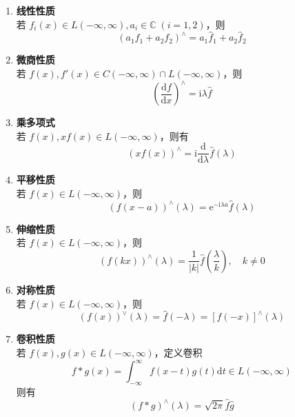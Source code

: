 \documentclass[12pt,a4paper]{ctexart}
\begin{document}
	\begin{enumerate}
		\item \textbf{线性性质} \\
		若 $f_i(x) \in L(-\infty, \infty), a_i \in \mathbb{C} \; (i=1,2)$，则
		\begin{equation}
			(a_1 f_1 + a_2 f_2)^{\wedge} = a_1 \hat{f}_1 + a_2 \hat{f}_2
		\end{equation}
		
		\item \textbf{微商性质} \\
		若 $f(x), f'(x) \in C(-\infty, \infty) \cap L(-\infty, \infty)$，则
		\begin{equation}
			\left( \frac{\mathrm{d}f}{\mathrm{d}x} \right)^{\wedge} = \mathrm{i}\lambda \hat{f}
		\end{equation}
		
		\item \textbf{乘多项式} \\
		若 $f(x), xf(x) \in L(-\infty, \infty)$，则有
		\begin{equation}
			(xf(x))^{\wedge} = \mathrm{i} \frac{\mathrm{d}}{\mathrm{d}\lambda} \hat{f}(\lambda)
		\end{equation}
		
		\item \textbf{平移性质} \\
		若 $f(x) \in L(-\infty, \infty)$，则
		\begin{equation}
			(f(x-a))^{\wedge}(\lambda) = \mathrm{e}^{-\mathrm{i}\lambda a} \hat{f}(\lambda)
		\end{equation}
		
		\item \textbf{伸缩性质} \\
		若 $f(x) \in L(-\infty, \infty)$，则
		\begin{equation}
			(f(kx))^{\wedge}(\lambda) = \frac{1}{|k|} \hat{f}\left( \frac{\lambda}{k} \right), \quad k \neq 0
		\end{equation}
		
		\item \textbf{对称性质} \\
		若 $f(x) \in L(-\infty, \infty)$，则
		\begin{equation}
			(f(x))^{\vee}(\lambda) = \hat{f}(-\lambda) = [f(-x)]^{\wedge}(\lambda)
		\end{equation}
		
		\item \textbf{卷积性质} \\
		若 $f(x), g(x) \in L(-\infty, \infty)$，定义卷积
		\[
		f * g(x) = \int_{-\infty}^{\infty} f(x-t)g(t) \mathrm{d}t \in L(-\infty, \infty)
		\]
		则有
		\begin{equation}
			(f * g)^{\wedge}(\lambda) = \sqrt{2\pi} \hat{f} \hat{g}
		\end{equation}
	\end{enumerate}
	
\end{document}

